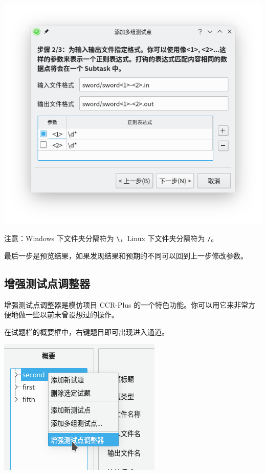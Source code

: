 \documentclass[UTF-8]{ctexart}
\begin{document}
			\begin{center}
			\includegraphics[scale=0.7]{pics/addtestcases.png}
			\end{center}
			
			注意：Windows 下文件夹分隔符为 \texttt{\textbackslash}，Linux 下文件夹分隔符为 \texttt{/}。
			
			最后一步是预览结果，如果发现结果和预期的不同可以回到上一步修改参数。
				
		\subsection{增强测试点调整器}
		
			增强测试点调整器是模仿项目 CCR-Plus 的一个特色功能。你可以用它来非常方便地做一些以前未曾设想过的操作。
			
			在试题栏的概要框中，右键题目即可出现进入通道。
			
			\begin{center}
			\includegraphics[scale=0.7]{pics/intoexttestcasemodifier.png}
			\end{center}
			
\end{document}
